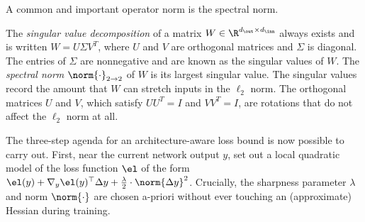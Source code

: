 A common and important operator norm is the spectral norm.

\begin{definitionbox}
    The \textit{singular value decomposition} of a matrix $W \in \R^{d_\out \times d_\inn}$ always exists and is written $W = U \Sigma V^T$, where $U$ and $V$ are orthogonal matrices and $\Sigma$ is diagonal. The entries of $\Sigma$ are nonnegative and are known as the singular values of $W$. The \textit{spectral norm} $\norm{\cdot}_{2 \to 2}$ of $W$ is its largest singular value. The singular values record the amount that $W$ can stretch inputs in the $\ell_2$ norm. The orthogonal matrices $U$ and $V$, which satisfy $UU^T = I$ and $VV^T = I$, are rotations that do not affect the $\ell_2$ norm at all.
\end{definitionbox}




    

    

The three-step agenda for an architecture-aware loss bound is now possible to carry out. First, near the current network output $y$, set out a local quadratic model of the loss function $\el$ of the form $\el(y) + \nabla_y \el(y)^\top\Delta y + \frac{\lambda}{2}\cdot \norm{\Delta y}^2$. Crucially, the sharpness parameter $\lambda$ and norm $\norm{\cdot}$ are chosen a-priori without ever touching an (approximate) Hessian during training.

